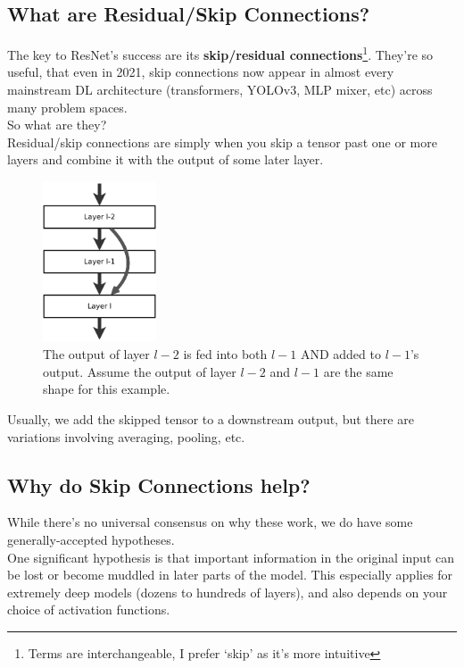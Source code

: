 \documentclass{article}
\begin{document}
\subsection{What are Residual/Skip Connections?}
The key to ResNet's success are its \textbf{skip/residual connections}\footnote{Terms are interchangeable, I prefer `skip' as it's more intuitive}. They're so useful, that even in 2021, skip connections now appear in almost every mainstream DL architecture (transformers, YOLOv3, MLP mixer, etc) across many problem spaces. \\

So what are they? \\

Residual/skip connections are simply when you skip a tensor past one or more layers and combine it with the output of some later layer. 

\begin{figure}[h]
\centering
\includegraphics[width=0.3\textwidth]{images/skip_connection.png}
\caption{The output of layer $l-2$ is fed into both $l-1$ AND added to $l-1$'s output. Assume the output of layer $l-2$ and $l-1$ are the same shape for this example.}
\end{figure}

Usually, we add the skipped tensor to a downstream output, but there are variations involving averaging, pooling, etc. \\


\newpage

\subsection{Why do Skip Connections help?}

While there's no universal consensus on why these work, we do have some generally-accepted hypotheses.  \\

One significant hypothesis is that important information in the original input can be lost or become muddled in later parts of the model. This especially applies for extremely deep models (dozens to hundreds of layers), and also depends on your choice of activation functions. \\
\end{document}
